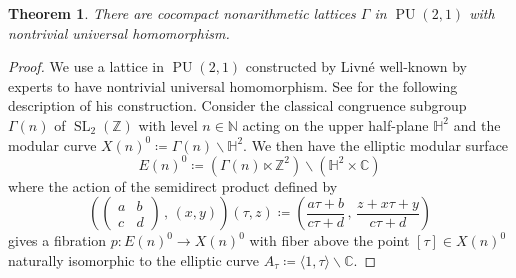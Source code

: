 \documentclass[11pt]{article}
\theoremstyle{plain}
\newtheorem{thm}{Theorem}[section]
\theoremstyle{definition}
\theoremstyle{remark}
\newcommand{\bbC}{\mathbb{C}}
\newcommand{\bbH}{\mathbb{H}}
\newcommand{\bbN}{\mathbb{N}}
\newcommand{\bbZ}{\mathbb{Z}}
\newcommand{\Gam}{\Gamma}
\DeclareMathOperator{\SL}{SL}
\DeclareMathOperator{\PU}{PU}
\newcommand{\bs}{\backslash}
\newenvironment{pf}{\begin{proof}}{\end{proof}}
\begin{document}
\begin{thm}\label{thm:Examples}
There are cocompact nonarithmetic lattices $\Gam$ in $\PU(2,1)$ with nontrivial universal homomorphism.
\end{thm}
\begin{pf}
We use a lattice in $\PU(2,1)$ constructed by Livn\'e \cite{Livne} well-known by experts to have nontrivial universal homomorphism. See \cite[\S 16]{DeligneMostow2} for the following description of his construction. Consider the classical congruence subgroup $\Gam(n)$ of $\SL_2(\bbZ)$ with level $n \in \bbN$ acting on the upper half-plane $\bbH^2$ and the modular curve $X(n)^0 \coloneqq \Gam(n) \bs \bbH^2$. We then have the elliptic modular surface
\begin{equation}\label{eq:Elliptic}
E(n)^0 \coloneqq\!\left(\Gam(n) \ltimes \bbZ^2\right)\! \bs \!\left(\bbH^2 \times \bbC\right)
\end{equation}
where the action of the semidirect product defined by
\begin{equation}\label{eq:EllipticAction}
\left(\begin{pmatrix} a & b \\ c & d \end{pmatrix}\, ,\, (x,y) \right)\!(\tau, z) \coloneqq\! \left( \frac{a \tau + b}{c \tau + d}\, ,\, \frac{z + x \tau + y}{c \tau + d} \right)
\end{equation}
gives a fibration $p : E(n)^0 \to X(n)^0$ with fiber above the point $[\tau] \in X(n)^0$ naturally isomorphic to the elliptic curve $A_\tau \coloneqq \langle 1, \tau \rangle \bs \bbC$.


\end{pf}
\end{document}
